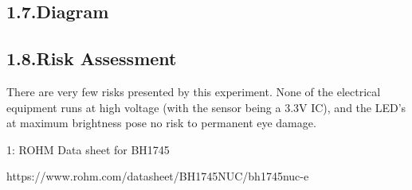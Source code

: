 \documentclass{article}
\begin{document}
\subsection{1.7.\hspace*{0.5em}Diagram}\label{sec-diagram}%

\subsection{1.8.\hspace*{0.5em}Risk Assessment}\label{sec-risk-assessment}%

\noindent{}There are very few risks presented by this experiment. None of the electrical equipment runs at high voltage (with the sensor being a 3.3V IC), and the LED's at maximum brightness pose no risk to permanent eye damage.%

{%
\begin{thebibliography}{0}%
\label{sec-bibliography}%

\mdbibitemlabel{}1: ROHM Data sheet for BH1745

https://www.rohm.com/datasheet/BH1745NUC/bh1745nuc-e%
\label{sensor}%
\par%
\end{thebibliography}}%
\end{document}
